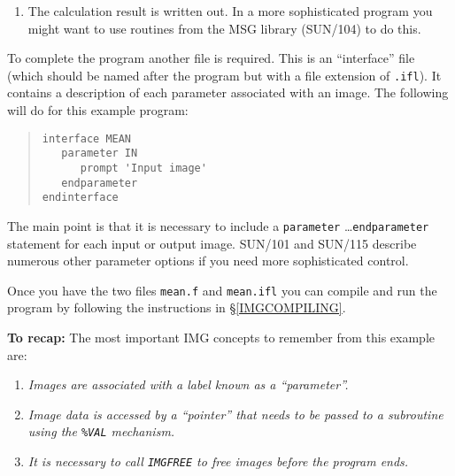 \documentclass[twoside,11pt]{article}
\newcommand{\htmladdnormallink}[2]{#1}
\newcommand{\hyperref}[4]{#2\ref{#4}#3}
\newcommand{\htmlref}[2]{#1}
\newcommand{\xref}[3]{#1}
\renewcommand{\_}{\texttt{\symbol{95}}}
\newcommand{\myverb}[1]{{\texttt{#1}}}
\newenvironment{code}{\begin{small} \begin{quote}}
                     {\end{quote} \end{small}}
\newenvironment{enumnotes}
{
   \renewcommand{\labelenumi}{\myverb{[\theenumi]}}
   \begin{enumerate}
}{
   \end{enumerate}
   \renewcommand{\labelenumi}{\theenumi}
}
\renewenvironment{enumnotes}
  {
    \begin{enumerate}
  }{
    \end{enumerate}
  }
\begin{document}
\begin{enumnotes}
Doing this means that the program will not crash if an earlier error
results in (say) the \myverb{IMAGE} array containing rubbish, and it
makes sure that you get a sensible error message at the end telling
you what went wrong.

\item The calculation result is written out. In a more sophisticated
program you might want to use routines from the MSG library
(\xref{SUN/104}{sun104}{}) to do this.
\end{enumnotes}

To complete the program another file is required. This is an
``interface'' file (which should be named after the program but with a
file extension of \myverb{.ifl}). It contains a description of each
parameter associated with an image.  The following will do
for this example program:
\begin{code}
\begin{verbatim}
interface MEAN
   parameter IN
      prompt 'Input image'
   endparameter
endinterface
\end{verbatim}
\end{code}
The main point is that it is necessary to include a \myverb{parameter}
\ldots \myverb{endparameter} statement for each input or output image.
\xref{SUN/101}{sun101}{} and \xref{SUN/115}{sun115}{} describe
numerous other parameter options if you need more sophisticated
control.

Once you have the two files
\htmladdnormallink{\myverb{mean.f}}{../../bin/examples/img/mean.f}
and
\htmladdnormallink{\myverb{mean.ifl}}{../../bin/examples/img/mean.ifl}
you can compile and run the program by following the instructions
\hyperref{given elsewhere}{in \S}{}{IMGCOMPILING}.

{\bf To recap:} The most important IMG concepts to remember
from this example are:

\begin{enumerate}
\item {\em Images are associated with a label known as a ``parameter''.}

\item {\em Image data is accessed by a ``pointer'' that needs to be passed
           to a subroutine using the \myverb{\%VAL} mechanism.}

\item {\em It is necessary to call \htmlref{\myverb{IMG\_FREE}}{IMG_FREE} to free
           images before the program ends.}
\end{enumerate}
\end{document}
